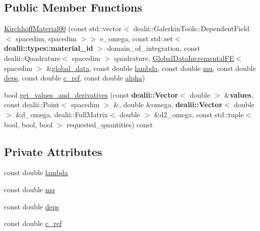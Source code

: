 \subsection*{Public Member Functions}
\begin{DoxyCompactItemize}
\item 
\hyperlink{classincremental_f_e_1_1_kirchhoff_material00_aed371b8af0803cbfb69989f78f99d6d0}{Kirchhoff\+Material00} (const std\+::vector$<$ dealii\+::\+Galerkin\+Tools\+::\+Dependent\+Field$<$ spacedim, spacedim $>$$>$ e\+\_\+omega, const std\+::set$<$ {\bf dealii\+::types\+::material\+\_\+id} $>$ domain\+\_\+of\+\_\+integration, const dealii\+::\+Quadrature$<$ spacedim $>$ quadrature, \hyperlink{classincremental_f_e_1_1_global_data_incremental_f_e}{Global\+Data\+Incremental\+FE}$<$ spacedim $>$ \&\hyperlink{classincremental_f_e_1_1_psi_3_01spacedim_00_01spacedim_01_4_abf0a4804877fd7cc9bd1b90e52760ba9}{global\+\_\+data}, const double \hyperlink{classincremental_f_e_1_1_kirchhoff_material00_a7dad9ce289d7ebe9363b82a2fd850067}{lambda}, const double \hyperlink{classincremental_f_e_1_1_kirchhoff_material00_a27770f7ae063508ca40aa009925c4a0b}{mu}, const double \hyperlink{classincremental_f_e_1_1_kirchhoff_material00_ae3992c464bbc9e18a3fc59ffec0b7bc3}{deps}, const double \hyperlink{classincremental_f_e_1_1_kirchhoff_material00_a4471a11a192ede0c9b16ea8ac9a35c4d}{c\+\_\+ref}, const double \hyperlink{classincremental_f_e_1_1_psi_3_01spacedim_00_01spacedim_01_4_af7b8227188dbdd6ada35b9445d96c79d}{alpha})
\item 
bool \hyperlink{classincremental_f_e_1_1_kirchhoff_material00_a5a8beb79b5b3758705bf75fe976f6cac}{get\+\_\+values\+\_\+and\+\_\+derivatives} (const {\bf dealii\+::\+Vector}$<$ double $>$ \&{\bf values}, const dealii\+::\+Point$<$ spacedim $>$ \&, double \&omega, {\bf dealii\+::\+Vector}$<$ double $>$ \&d\+\_\+omega, dealii\+::\+Full\+Matrix$<$ double $>$ \&d2\+\_\+omega, const std\+::tuple$<$ bool, bool, bool $>$ requested\+\_\+quantities) const 
\end{DoxyCompactItemize}
\subsection*{Private Attributes}
\begin{DoxyCompactItemize}
\item 
const double \hyperlink{classincremental_f_e_1_1_kirchhoff_material00_a7dad9ce289d7ebe9363b82a2fd850067}{lambda}
\item 
const double \hyperlink{classincremental_f_e_1_1_kirchhoff_material00_a27770f7ae063508ca40aa009925c4a0b}{mu}
\item 
const double \hyperlink{classincremental_f_e_1_1_kirchhoff_material00_ae3992c464bbc9e18a3fc59ffec0b7bc3}{deps}
\item 
const double \hyperlink{classincremental_f_e_1_1_kirchhoff_material00_a4471a11a192ede0c9b16ea8ac9a35c4d}{c\+\_\+ref}
\end{DoxyCompactItemize}


